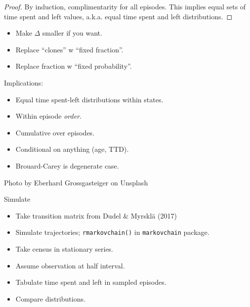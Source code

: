 \documentclass[20pt,usenames,dvipsnames]{beamer}
\begin{document}
\begin{frame}[plain]
\Large
\begin{proof}
By induction, complimentarity for all episodes. This implies equal sets of time
spent and left values, a.k.a. equal time spent and left distributions.
\end{proof}

\pause
\begin{itemize}[<+->]
  \item Make $\Delta$ smaller if you want.
  \item Replace ``clones'' w ``fixed fraction''.
  \item Replace fraction w ``fixed probability''.
\end{itemize}
\end{frame}

\begin{frame}[plain]
\Large
\begin{center}
Implications:
\pause
\begin{itemize}[<+->]
  \item Equal time spent-left distributions within states.
  \item Within episode \emph{order}. 
  \item Cumulative over episodes.
  \item Conditional on anything (age, TTD).
  \item Brouard-Carey is degenerate case.
\end{itemize}
\end{center}
\end{frame}

{
\begin{frame}[plain]
\tiny
\flushright
\vspace{18cm}
   Photo by Eberhard Grossgasteiger on Unsplash
\end{frame}
}
\begin{frame}[plain]
\Large
\begin{center}
Simulate
\begin{itemize}[<+->]
  \item Take transition matrix from \normalsize{Dudel \& Myrskl\"a (2017)}
  \item Simulate trajectories; \texttt{rmarkovchain()} in \texttt{markovchain}
  package.
  \item Take census in stationary series. 
  \item Assume observation at half interval.
  \item Tabulate time spent and left in sampled episodes.
  \item Compare distributions.
\end{itemize}
\end{center}
\end{frame}
\end{document}
